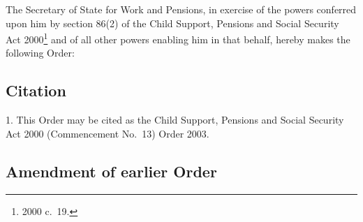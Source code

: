 \documentclass[12pt,a4paper]{article}
\title{\regstitle}
\author{S.I.\ 2003 No.\ 346 (C.\ 21)}
\date{Made
22nd February 2003\\
}
\begin{document}
\maketitle

\noindent
The Secretary of State for Work and Pensions, in exercise of the powers conferred upon him by section 86(2) of the Child Support, Pensions and Social Security Act 2000\footnote{2000 c.\ 19.} and of all other powers enabling him in that behalf, hereby makes the following Order: 

\enlargethispage{\baselineskip}

{\sloppy

\tableofcontents

}

\bigskip

\setcounter{secnumdepth}{-2}

\subsection[1. Citation]{Citation}

1.  This Order may be cited as the Child Support, Pensions and Social Security Act 2000 (Commencement No.\ 13) Order 2003.

\subsection[2. Amendment of earlier Order]{Amendment of earlier Order}
\end{document}
